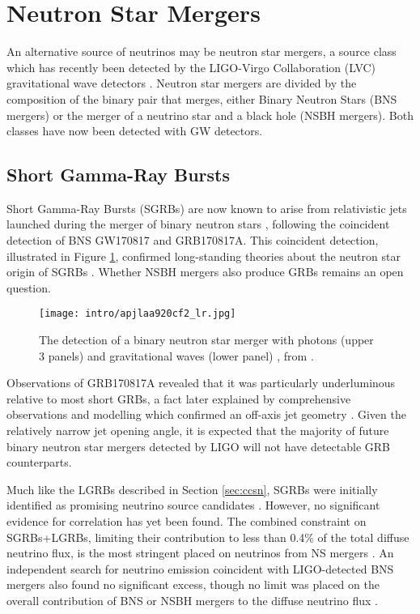 \section{Neutron Star Mergers}
\label{sec:ns_mergers}

An alternative source of neutrinos may be neutron star mergers, a source class which has recently been detected by the LIGO-Virgo Collaboration (LVC) gravitational wave detectors . Neutron star mergers are divided by the composition of the binary pair that merges, either Binary Neutron Stars (BNS mergers) or the merger of a neutrino star and a black hole (NSBH mergers). Both classes have now been detected with GW detectors.

\subsection{Short Gamma-Ray Bursts}

Short Gamma-Ray Bursts (SGRBs) are now known to arise from relativistic jets launched during the merger of binary neutron stars , following the coincident detection of BNS GW170817 and GRB170817A. This coincident detection, illustrated in Figure \ref{fig:gw170817}, confirmed long-standing theories about the neutron star origin of SGRBs . Whether NSBH mergers also produce GRBs remains an open question.

\begin{figure}[!ht]
	\centering \texttt{[image: intro/apjlaa920cf2\_lr.jpg]}
	\caption{The detection of a binary neutron star merger with photons (upper 3 panels) and gravitational waves (lower panel) , from \cite{grb170817}.}
	\label{fig:gw170817}
\end{figure}

Observations of GRB170817A revealed that it was particularly underluminous relative to most short GRBs, a fact later explained by comprehensive observations and modelling which confirmed an off-axis jet geometry . Given the relatively narrow jet opening angle, it is expected that the majority of future binary neutron star mergers detected by LIGO will not have detectable GRB counterparts.

Much like the LGRBs described in Section \ref{sec:ccsn}, SGRBs were initially identified as promising neutrino source candidates \cite{waxman_bahcall_97_grb}. However, no significant evidence for correlation has yet been found. The combined constraint on SGRBs+LGRBs, limiting their contribution to less than 0.4\% of the total diffuse neutrino flux, is the most stringent placed on neutrinos from NS mergers \cite{ic_grb_17}. An independent search for neutrino emission coincident with LIGO-detected BNS mergers also found no significant excess, though no limit was placed on the overall contribution of BNS or NSBH mergers to the diffuse neutrino flux .

